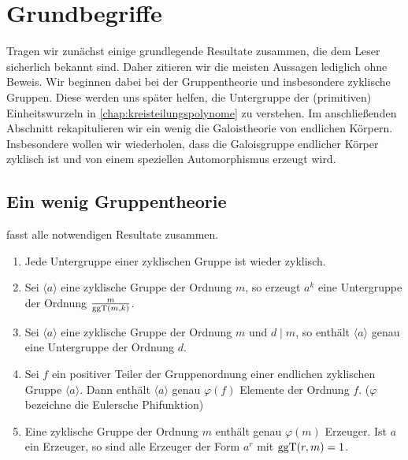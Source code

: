 \chapter{Grundbegriffe}
\label{chap:grundbegriffe}

Tragen wir zunächst 
einige grundlegende Resultate zusammen, die dem Leser sicherlich bekannt sind. 
Daher zitieren wir die meisten Aussagen 
lediglich ohne Beweis. Wir beginnen dabei bei der Gruppentheorie und
insbesondere zyklische Gruppen. Diese werden uns später
helfen, die Untergruppe der (primitiven) Einheitswurzeln
in \autoref{chap:kreisteilungspolynome} zu verstehen. Im anschließenden Abschnitt
rekapitulieren wir ein wenig die Galoistheorie von endlichen Körpern.
Insbesondere wollen wir wiederholen, dass die 
Galoisgruppe endlicher Körper zyklisch ist und von einem
speziellen Automorphismus erzeugt wird.

\section{Ein wenig Gruppentheorie}


\autocite[Theorem 1.15]{lidl1997finite} fasst alle notwendigen Resultate
zusammen.

\begin{satz}
  \label{satz:zykl_gruppen}
  \begin{enumerate}
    \item Jede Untergruppe einer zyklischen Gruppe ist wieder zyklisch.
    \item Sei $\langle a \rangle$ eine zyklische Gruppe der Ordnung $m$,
      so erzeugt $a^k$ eine Untergruppe der Ordnung $\frac{m}{\operatorname{ggT}(m,k)}$.
    \item Sei $\langle a\rangle$ eine zyklische Gruppe der Ordnung $m$ und
      $d \mid m$, so enthält $\langle a \rangle$ genau eine Untergruppe der
      Ordnung $d$.
     \item Sei $f$ ein positiver Teiler der Gruppenordnung einer endlichen
        zyklischen Gruppe $\langle a \rangle$. Dann enthält $\langle a \rangle$
        genau $\varphi(f)$ Elemente der Ordnung $f$.
        ($\varphi$ bezeichne die Eulersche Phifunktion)
     \item Eine zyklische Gruppe der Ordnung $m$ enthält genau $\varphi(m)$
        Erzeuger. Ist $a$ ein Erzeuger, so sind alle Erzeuger der Form
        $a^r$ mit $\operatorname{ggT}(r,m) = 1$.
  \end{enumerate}
\end{satz}

